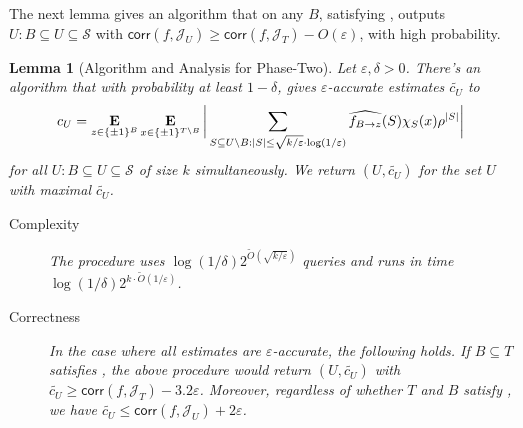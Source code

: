 \documentclass[10pt,a4paper]{article}
\theoremstyle{plain}
\newtheorem{lemma}[theorem]{Lemma}
\theoremstyle{remark}
\theoremstyle{plain}
\providecommand{\E}{}
\renewcommand{\E}{\mathop{\bf E\/}}
\newcommand{\eps}{\varepsilon}
\renewcommand{\hat}{\widehat}
\renewcommand{\tilde}{\widetilde}
\newcommand{\pmone}{\{\pm 1\}}
\newcommand{\calJ}{\mathcal{J}}
\newcommand{\calS}{\mathcal{S}}
\newcommand{\InfluentialCoords}{\calS}
\newcommand{\BooleanHypercube}[1]{\{\pm 1\}^{#1}}
\newcommand{\corr}{\mathsf{corr}}
\begin{document}
The next lemma gives an algorithm that on any $B$,  satisfying ,  outputs $U: B \subseteq U \subseteq \InfluentialCoords$
with $\corr(f, \calJ_U) \ge \corr(f, \calJ_T)-O(\eps)$, with high probability. 
%
\begin{lemma}[Algorithm and Analysis for Phase-Two]\label{lemma:phase-two-correctness}
Let $\eps,\delta>0$. There's an algorithm that with probability at least $1-\delta$, gives $\eps$-accurate estimates $\tilde{c_U}$ to 
$$
{c_U} =  \E_{z\in \pmone^B}\E_{x \in \BooleanHypercube{T\setminus B}}\bigg | \sum_{S\subseteq U\setminus B:|S|\le \sqrt{k/\eps} \cdot \log(1/\eps)}\hat{f_{B\to z}}(S) \chi_S(x)\rho^{|S|}\bigg |
$$
for all $U: B \subseteq U \subseteq \InfluentialCoords$ of size $k$ simultaneously.
We  return  $(U,\tilde{c_U})$ for the set $U$ with maximal $\tilde{c_U}$.

\begin{description}
\item[Complexity] The procedure uses $\log(1/\delta)2^{\tilde{O}(\sqrt{k/\eps})}$ queries and runs in time $\log(1/\delta)2^{k\cdot \tilde{O}(1/\eps)}$.
\item[Correctness]
In the case where all estimates are $\eps$-accurate, the following holds.
If $B\subseteq T$  satisfies , the above procedure would return $(U, \tilde{c_U})$ with $\tilde{c_U} \ge \corr(f, \calJ_T) - 3.2\eps$.
Moreover, regardless of whether $T$ and $B$ satisfy , we have $\tilde{c_U} \le \corr(f, \calJ_U) + 2\eps$.
\end{description}


\end{lemma}
\end{document}
